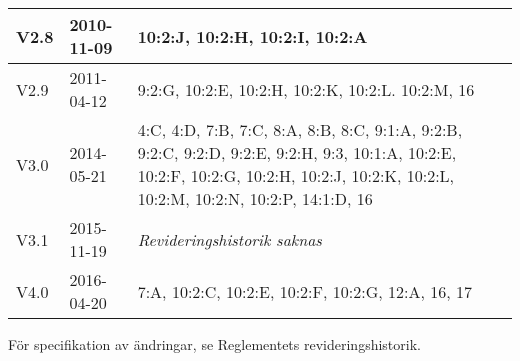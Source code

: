 \documentclass[10pt]{article}
\begin{document}
\begin{center}
\begin{tabular}{| l | l | p{10cm} |}
    \hline
    V2.8 & 2010-11-09 & 10:2:J, 10:2:H, 10:2:I, 10:2:A\\
    \hline
    V2.9 & 2011-04-12 & 9:2:G, 10:2:E, 10:2:H, 10:2:K, 10:2:L. 10:2:M, 16 \\
    \hline
    V3.0 & 2014-05-21 &  4:C, 4:D, 7:B, 7:C, 8:A, 8:B, 8:C, 9:1:A, 9:2:B, 9:2:C, 9:2:D, 9:2:E, 9:2:H, 9:3, 10:1:A, 10:2:E, 10:2:F, 10:2:G, 10:2:H, 10:2:J, 10:2:K, 10:2:L, 10:2:M, 10:2:N, 10:2:P, 14:1:D, 16\\
    \hline
    V3.1 & 2015-11-19 & \emph{Revideringshistorik saknas} \\
    \hline
    V4.0 & 2016-04-20 & 7:A, 10:2:C, 10:2:E, 10:2:F, 10:2:G, 12:A, 16, 17 \\
    \hline
\end{tabular}
\end{center}
För specifikation av ändringar, se Reglementets revideringshistorik.
\end{document}
